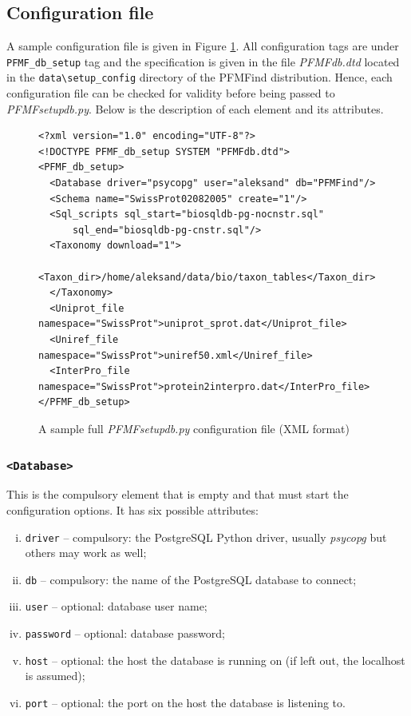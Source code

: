 \documentclass[11pt]{article}
\begin{document}
\subsection{Configuration file}\label{sec:dbconfig}

A sample configuration file is given in Figure \ref{fig:config}. All configuration tags are under {\tt PFMF\_db\_setup} tag and the specification is given in the file {\it PFMFdb.dtd} located in the \verb|data\setup_config| directory of the PFMFind distribution. Hence, each configuration file can be checked for validity before being passed to {\it PFMFsetupdb.py}. Below is the description of each element and its attributes.


\begin{figure}[ht!]
\begin{verbatim}
<?xml version="1.0" encoding="UTF-8"?>
<!DOCTYPE PFMF_db_setup SYSTEM "PFMFdb.dtd">
<PFMF_db_setup>
  <Database driver="psycopg" user="aleksand" db="PFMFind"/>
  <Schema name="SwissProt02082005" create="1"/>
  <Sql_scripts sql_start="biosqldb-pg-nocnstr.sql" 
      sql_end="biosqldb-pg-cnstr.sql"/>
  <Taxonomy download="1">
  <Taxon_dir>/home/aleksand/data/bio/taxon_tables</Taxon_dir>
  </Taxonomy>
  <Uniprot_file namespace="SwissProt">uniprot_sprot.dat</Uniprot_file>
  <Uniref_file namespace="SwissProt">uniref50.xml</Uniref_file>
  <InterPro_file namespace="SwissProt">protein2interpro.dat</InterPro_file>
</PFMF_db_setup>
\end{verbatim}
\caption{A sample full {\it PFMFsetupdb.py} configuration file (XML format)}\label{fig:config}
\end{figure}

\subsubsection*{{\tt <Database>}}

This is the compulsory element that is empty and that must start the configuration options. It has six possible attributes:
\begin{enumerate}[(i)]
\item {\tt driver} -- compulsory: the PostgreSQL Python driver, usually {\it psycopg} but others may work as well;
\item {\tt db} -- compulsory: the name of the PostgreSQL database to connect;
\item {\tt user} -- optional: database user name;
\item {\tt password} -- optional: database password;
\item {\tt host} -- optional: the host the database is running on (if left out, the localhost is assumed);
\item {\tt port} -- optional: the port on the host the database is listening to.
\end{enumerate}
\end{document}
